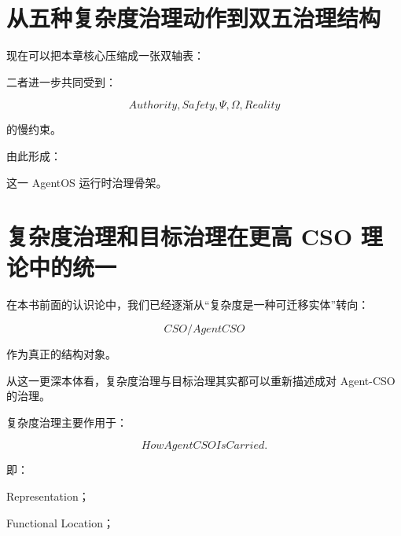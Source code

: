 \section{从五种复杂度治理动作到双五治理结构}

现在可以把本章核心压缩成一张双轴表：

\begin{statementbox}
\centering
{}
\end{statementbox}

二者进一步共同受到：

\[
\boxed{
Authority,
Safety,
\Psi,
\Omega,
Reality
}
\]

的慢约束。

由此形成：

\begin{statementbox}
\centering
{}
\end{statementbox}

这一 AgentOS 运行时治理骨架。


\section{复杂度治理和目标治理在更高 CSO 理论中的统一}

在本书前面的认识论中，我们已经逐渐从``复杂度是一种可迁移实体''转向：

\[
\boxed{
CSO/AgentCSO
}
\]

作为真正的结构对象。

从这一更深本体看，复杂度治理与目标治理其实都可以重新描述成对 Agent-CSO 的治理。

复杂度治理主要作用于：

\[
\boxed{
HowAgentCSOIsCarried.
}
\]

即：

Representation；

Functional Location；

